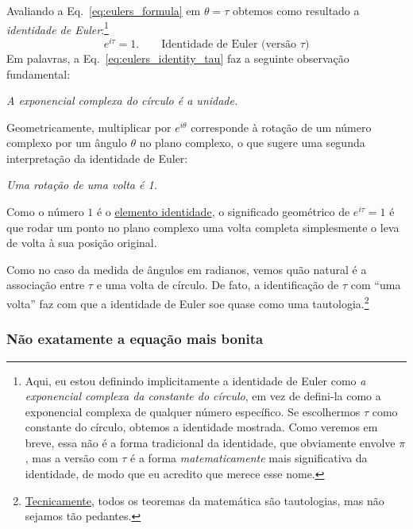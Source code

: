 Avaliando a Eq.~\eqref{eq:eulers_formula} em $\theta = \tau$ obtemos como resultado a \emph{identidade de Euler}:\footnote{Aqui, eu estou definindo implicitamente a identidade de Euler como \emph{a exponencial complexa da constante do círculo}, em vez de defini-la como a exponencial complexa de qualquer número específico. Se escolhermos $\tau$ como constante do círculo, obtemos a identidade mostrada. Como veremos em breve, essa não é a forma tradicional da identidade, que obviamente envolve $\pi$, mas a versão com $\tau$ é a forma \emph{matematicamente} mais significativa da identidade, de modo que eu acredito que merece esse nome.}
\begin{equation}
\label{eq:eulers_identity_tau}
e^{i\tau} = 1. \qquad\mbox{Identidade de Euler (versão $\tau$)}
\end{equation}
Em palavras, a Eq.~\eqref{eq:eulers_identity_tau} faz a seguinte observação fundamental:

\begin{center}
\emph{A exponencial complexa do círculo é a unidade.}
\end{center}

Geometricamente, multiplicar por $e^{i\theta}$ corresponde à rotação de um número complexo por um ângulo $\theta$ no plano complexo, o que sugere uma segunda interpretação da identidade de Euler:

\begin{center}
\emph{Uma rotação de uma volta é 1.}
\end{center}

\noindent Como o número $1$ é o \href{https://pt.wikipedia.org/wiki/Elemento_neutro}{elemento identidade}, o significado geométrico de $e^{i\tau} = 1$ é que rodar um ponto no plano complexo uma volta completa simplesmente o leva de volta à sua posição original.

Como no caso da medida de ângulos em radianos, vemos quão natural é a associação entre $\tau$ e uma volta de círculo. De fato, a identificação de $\tau$ com ``uma volta'' faz com que a identidade de Euler soe quase como uma tautologia.\footnote{\href{https://xkcd.com/1475/}{Tecnicamente}, todos os teoremas da matemática são tautologias, mas não sejamos tão pedantes.}

    \subsubsection{Não exatamente a equação mais bonita} %
    \label{sec:not_the_most_beautiful_equation}

